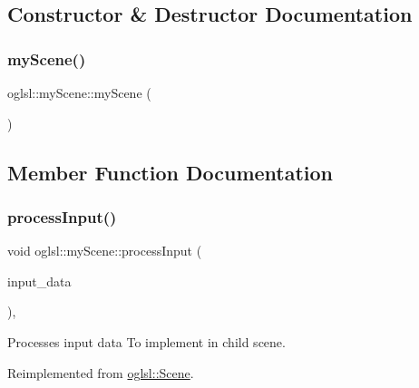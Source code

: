 \subsection{Constructor \& Destructor Documentation}
\mbox{\label{classoglsl_1_1my_scene_a1ea16fb5ced9ac6f5fea4db7688d6076}} 
\subsubsection{\texorpdfstring{my\+Scene()}{myScene()}}
{\footnotesize\ttfamily oglsl\+::my\+Scene\+::my\+Scene (\begin{DoxyParamCaption}{ }\end{DoxyParamCaption})}



\subsection{Member Function Documentation}
\mbox{\label{classoglsl_1_1my_scene_aeab1e8cfe8c40f6110e1789a74008191}} 
\subsubsection{\texorpdfstring{process\+Input()}{processInput()}}
{\footnotesize\ttfamily void oglsl\+::my\+Scene\+::process\+Input (\begin{DoxyParamCaption}\item[{\mbox{\hyperlink{classoglsl_1_1_input_a3b21d7328538e661f366af5d6059c197}{Input\+::\+Input\+Data}}}]{input\+\_\+data }\end{DoxyParamCaption})\hspace{0.3cm}{\ttfamily [override]}, {\ttfamily [virtual]}}



Processes input data To implement in child scene. 



Reimplemented from \mbox{\hyperlink{classoglsl_1_1_scene_a7884a3f2b7900aaf348a62ad23223c8e}{oglsl\+::\+Scene}}.

\mbox{\label{classoglsl_1_1my_scene_a798dcfe11aee5c093013c59b665b6754}} 
